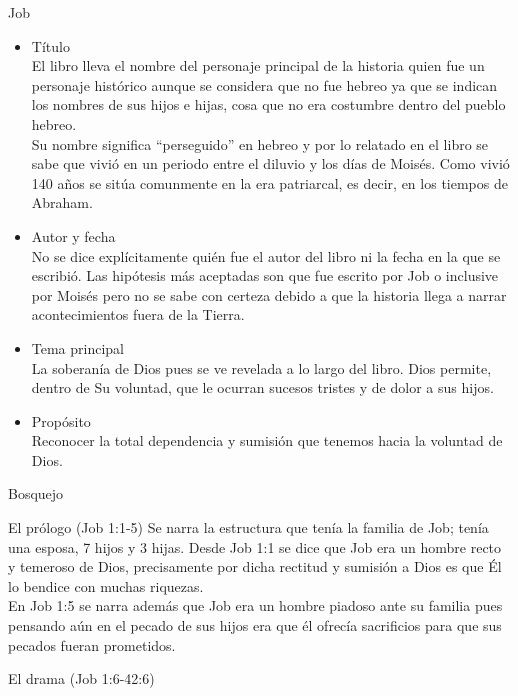%
%
\begin{section}{Job}
	\begin{itemize}
		\item Título\\
			El libro lleva el nombre del personaje principal de la historia quien fue un personaje histórico aunque se considera que no fue hebreo ya que se indican los nombres de sus hijos e hijas, cosa que no era costumbre dentro del pueblo hebreo.\\
			Su nombre significa ``perseguido'' en hebreo y por lo relatado en el libro se sabe que vivió en un periodo entre el diluvio y los días de Moisés. Como vivió 140 años se sitúa comunmente en la era patriarcal, es decir, en los tiempos de Abraham.
		\item Autor y fecha\\
			No se dice explícitamente quién fue el autor del libro ni la fecha en la que se escribió. Las hipótesis más aceptadas son que fue escrito por Job o inclusive por Moisés pero no se sabe con certeza debido a que la historia llega a narrar acontecimientos fuera de la Tierra.
		\item Tema principal\\
			La soberanía de Dios pues se ve revelada a lo largo del libro. Dios permite, dentro de Su voluntad, que le ocurran sucesos tristes y de dolor a sus hijos.
		\item Propósito\\
			Reconocer la total dependencia y sumisión que tenemos hacia la voluntad de Dios.
	\end{itemize}
	\begin{subsection}{Bosquejo}
		\begin{subsubsection}{El prólogo (Job 1:1-5)}
Se narra la estructura que tenía la familia de Job; tenía una esposa, 7 hijos y 3 hijas. Desde Job 1:1 se dice que Job era un hombre recto y temeroso de Dios, precisamente por dicha rectitud y sumisión a Dios es que Él lo bendice con muchas riquezas.\\
En Job 1:5 se narra además que Job era un hombre piadoso ante su familia pues pensando aún en el pecado de sus hijos era que él ofrecía sacrificios para que sus pecados fueran prometidos.
		\end{subsubsection}
		\begin{subsubsection}{El drama (Job 1:6-42:6)}

\end{subsubsection}
\end{subsection}
\end{section}
